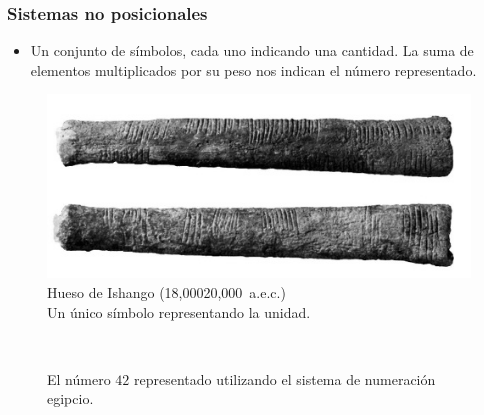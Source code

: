 \documentclass[11pt,a4paper,spanish]{beamer}
\newcommand{\aprox}{\raisebox{0.5ex}{\texttildelow}}
\begin{document}
\begin{frame}

\frametitle{Sistemas no posicionales}

\begin{itemize}
    \item Un conjunto de símbolos, cada uno indicando una cantidad. La suma de
        elementos multiplicados por su peso nos indican el número
        representado.
\end{itemize}

\begin{minipage}{0.45\textwidth}
\pause
\begin{figure}
    \centering
    \includegraphics[width=1.0\textwidth]{img/ishango.jpg}
    \captionsetup{textfont=tiny,labelformat=empty,justification=centering}
    \caption{Hueso de Ishango (18,000{\aprox}20,000~a.e.c.)\ccbysa\cite{ishango}\\
    Un único símbolo representando la unidad.}
\end{figure}
\end{minipage}
~
\begin{minipage}{0.45\textwidth}
\pause
\begin{figure}
    \centering
    \captionsetup{textfont=tiny,labelformat=empty,justification=centering}
    \caption{El número $42$ representado utilizando el sistema de numeración
    egipcio.}
\end{figure}
\end{minipage}

\end{frame}
\end{document}
